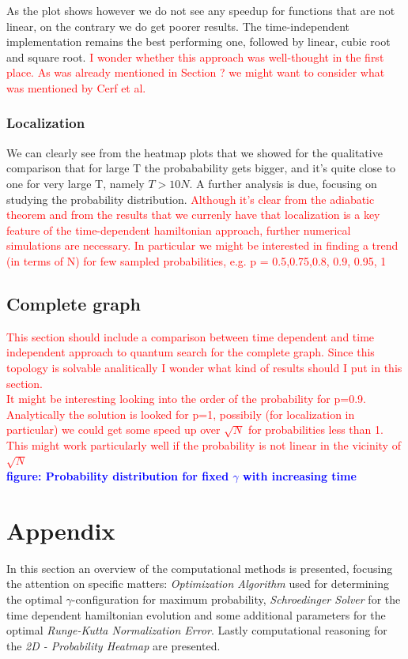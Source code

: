 \documentclass[aps,pra,reprint, onecolumn, showkeys]{revtex4-2}
\newcommand{\red}[1]{\textcolor{red}{#1}}
\newcommand{\blue}[1]{\textcolor{blue}{\textbf{figure: #1}}}
\begin{document}
As the plot shows however we do not see any speedup for functions that are not linear, on the contrary we do get poorer results. The time-independent implementation remains the best performing one, followed by linear, cubic root and square root. \red{I wonder whether this approach was well-thought in the first place. As was already mentioned in Section ? we might want to consider what was mentioned by Cerf et al.}

\subsubsection{Localization}
We can clearly see from the heatmap plots that we showed for the qualitative comparison that for large T the probabability gets bigger, and it's quite close to one for very large T, namely $T>10N$. A further analysis is due, focusing on studying the probability distribution. \red{Although it's clear from the adiabatic theorem and from the results that we currenly have that localization is a key feature of the time-dependent hamiltonian approach, further numerical simulations are necessary. In particular we might be interested in finding a trend (in terms of N) for few sampled probabilities, e.g. p = 0.5,0.75,0.8, 0.9, 0.95, 1  }

\subsection{Complete graph}
\red{This section should include a comparison between time dependent and time independent approach to quantum search for the complete graph. Since this topology is solvable analitically I wonder what kind of results should I put in this section.\\ It might be interesting looking into the order of the probability for p=0.9. Analytically the solution is looked for p=1, possibily (for localization in particular) we could get some speed up over $\sqrt{N}$ for probabilities less than 1. This might work particularly well if the probability is not linear in the vicinity of $\sqrt{N}$ }\\ \blue{Probability distribution for fixed $\gamma$ with increasing time}

\section{Appendix}
In this section an overview of the computational methods is presented, focusing the attention on specific matters: \textit{Optimization Algorithm} used for determining the optimal $\gamma$-configuration for maximum probability, \textit{Schroedinger Solver} for the time dependent hamiltonian evolution and some additional parameters for the optimal \textit{Runge-Kutta Normalization Error}. Lastly computational reasoning for the \textit{2D - Probability Heatmap} are presented. \\
\end{document}
